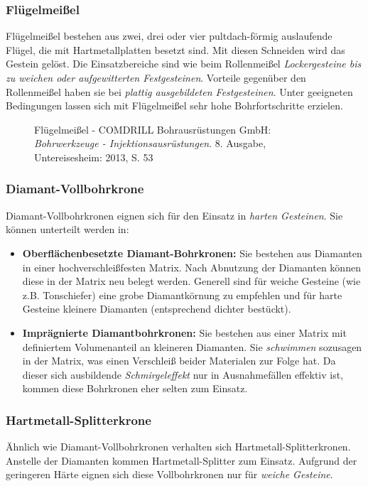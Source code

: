 \documentclass[12pt,a4paper,draft]{scrartcl} %
\begin{document}
\newpage
\subsubsection{Flügelmeißel}
Flügelmeißel bestehen aus zwei, drei oder vier pultdach-förmig auslaufende Flügel, die mit Hartmetallplatten besetzt sind. Mit diesen Schneiden wird das Gestein gelöst. Die Einsatzbereiche sind wie beim Rollenmeißel \emph{Lockergesteine bis zu weichen oder aufgewitterten Festgesteinen}. Vorteile gegenüber den Rollenmeißel haben sie bei \emph{plattig ausgebildeten Festgesteinen}. Unter geeigneten Bedingungen lassen sich mit Flügelmeißel sehr hohe Bohrfortschritte erzielen.

\begin{figure}[H]
\centering
\caption{Flügelmeißel - COMDRILL Bohrausrüstungen GmbH: \emph{Bohrwerkzeuge - Injektionsausrüstungen}. 8. Ausgabe, Untereisesheim: 2013, S. 53}
\end{figure}

\subsubsection{Diamant-Vollbohrkrone}
Diamant-Vollbohrkronen eignen sich für den Einsatz in \emph{harten Gesteinen}. Sie können unterteilt werden in:

\begin{itemize}
\item \textbf{Oberflächenbesetzte Diamant-Bohrkronen:} Sie bestehen aus Diamanten in einer hochverschleißfesten Matrix. Nach Abnutzung der Diamanten können diese in der Matrix neu belegt werden. Generell sind für weiche Gesteine (wie z.B. Tonschiefer) eine grobe Diamantkörnung zu empfehlen und für harte Gesteine kleinere Diamanten (entsprechend dichter bestückt).
\item \textbf{Imprägnierte Diamantbohrkronen:} Sie bestehen aus einer Matrix mit definiertem Volumenanteil an kleineren Diamanten. Sie \emph{schwimmen} sozusagen in der Matrix, was einen Verschleiß beider Materialen zur Folge hat. Da dieser sich ausbildende \emph{Schmirgeleffekt} nur in Ausnahmefällen effektiv ist, kommen diese Bohrkronen eher selten zum Einsatz.
\end{itemize}

\subsubsection{Hartmetall-Splitterkrone}
Ähnlich wie Diamant-Vollbohrkronen verhalten sich Hartmetall-Splitterkronen. Anstelle der Diamanten kommen Hartmetall-Splitter zum Einsatz. Aufgrund der geringeren Härte eignen sich diese Vollbohrkronen nur für \emph{weiche Gesteine}.\\
\end{document}
